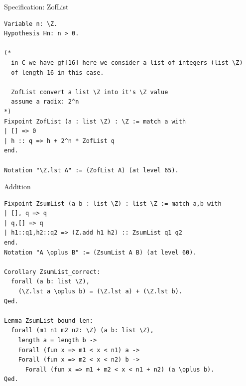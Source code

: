 \documentclass[8pt]{beamer}
\begin{document}
\begin{frame}[fragile]{Specification: ZofList}
  \begin{center}
\begin{lstlisting}[language=Coq, caption=ZofList, label=cod:languageC81]
Variable n: \Z.
Hypothesis Hn: n > 0.

(*
  in C we have gf[16] here we consider a list of integers (list \Z)
  of length 16 in this case.

  ZofList convert a list \Z into it's \Z value
  assume a radix: 2^n
*)
Fixpoint ZofList (a : list \Z) : \Z := match a with
| [] => 0
| h :: q => h + 2^n * ZofList q
end.

Notation "\Z.lst A" := (ZofList A) (at level 65).
\end{lstlisting}






  \end{center}
\end{frame}


%
%

\begin{frame}[fragile]{Addition}
  \begin{center}
\begin{lstlisting}[language=Coq, caption=Addition, label=cod:languageC91]
Fixpoint ZsumList (a b : list \Z) : list \Z := match a,b with
| [], q => q
| q,[] => q
| h1::q1,h2::q2 => (Z.add h1 h2) :: ZsumList q1 q2
end.
Notation "A \oplus B" := (ZsumList A B) (at level 60).

Corollary ZsumList_correct:
  forall (a b: list \Z),
    (\Z.lst a \oplus b) = (\Z.lst a) + (\Z.lst b).
Qed.

Lemma ZsumList_bound_len:
  forall (m1 n1 m2 n2: \Z) (a b: list \Z),
    length a = length b ->
    Forall (fun x => m1 < x < n1) a ->
    Forall (fun x => m2 < x < n2) b ->
      Forall (fun x => m1 + m2 < x < n1 + n2) (a \oplus b).
Qed.
\end{lstlisting}

  \end{center}
\end{frame}
\end{document}
